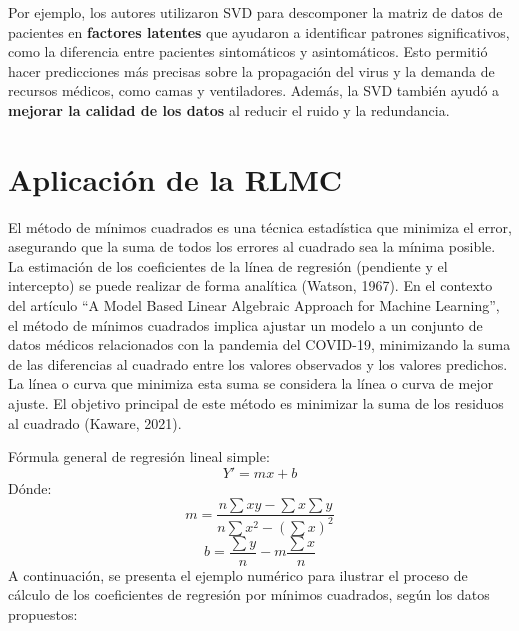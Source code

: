 \documentclass[12pt]{article}
\begin{document}
        Por ejemplo, los autores utilizaron SVD para descomponer la matriz de datos de pacientes en \textbf{factores latentes} que ayudaron a identificar patrones significativos, como la diferencia entre pacientes sintomáticos y asintomáticos. Esto permitió hacer predicciones más precisas sobre la propagación del virus y la demanda de recursos médicos, como camas y ventiladores. Además, la SVD también ayudó a \textbf{mejorar la calidad de los datos} al reducir el ruido y la redundancia.
        
        \section*{Aplicación de la RLMC}
        \noindent
        El método de mínimos cuadrados es una técnica estadística que minimiza el error, asegurando que la suma de todos los errores al cuadrado sea la mínima posible. La estimación de los coeficientes de la línea de regresión (pendiente y el intercepto) se puede realizar de forma analítica (Watson, 1967). En el contexto del artículo “A Model Based Linear Algebraic Approach for Machine Learning”, el método de mínimos cuadrados implica ajustar un modelo a un conjunto de datos médicos relacionados con la pandemia del COVID-19, minimizando la suma de las diferencias al cuadrado entre los valores observados y los valores predichos. La línea o curva que minimiza esta suma se considera la línea o curva de mejor ajuste. El objetivo principal de este método es minimizar la suma de los residuos al cuadrado (Kaware, 2021).
        
        \vspace{0.5em}
        \noindent
        Fórmula general de regresión lineal simple:
        \[
         Y' = mx + b 
        \]
        \noindent
        Dónde:
        \[
        m = \frac{n \sum xy - \sum x \sum y}{n \sum x^{2} - (\sum x)^2}
        \]
        \[
        b = \frac{\sum y}{n} - m \frac{\sum x}{n}
        \]
        \noindent
        A continuación, se presenta el ejemplo numérico para ilustrar el proceso de cálculo de los coeficientes de regresión por mínimos cuadrados, según los datos propuestos:
        
\end{document}
